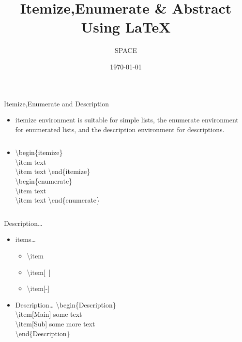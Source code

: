 \documentclass{beamer}
\title{Itemize,Enumerate \& Abstract \\ Using \LaTeX}
\author{SPACE}
\date{\today}
\begin{document}
\maketitle
\begin{frame}{Itemize,Enumerate and Description}
\begin{itemize}
\pause \item itemize environment is suitable for simple lists, the enumerate environment for enumerated lists, and the description environment for descriptions.\vspace{0.5cm}
\pause\item[]\begin{columns}[c]
\column{1.5in}
\textbackslash begin\{itemize\}\\
\textbackslash item text\\
\textbackslash item text
\textbackslash end\{itemize\}\\
\column{1.5in}
\textbackslash begin\{enumerate\}\\
\textbackslash item text\\
\textbackslash item text
\textbackslash end\{enumerate\}
\end{columns}
\end{itemize}
\end{frame}

\begin{frame}{Description\ldots}
\begin{itemize}
\item[] \begin{block}{items\ldots}
\begin{itemize}
\pause\item \textbackslash item
\pause\item \textbackslash item[~]
\pause\item \textbackslash item[-]
\end{itemize}
\end{block}
\pause\item[] \begin{block}{Description\ldots}
\textbackslash begin\{Description\}\\
\textbackslash item[Main] some text\\
\textbackslash item[Sub] some more text\\
\textbackslash end\{Description\}
\end{block}
\end{itemize}
\end{frame}
\end{document}

